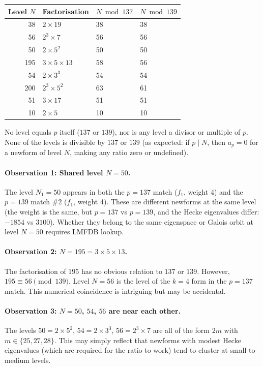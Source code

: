 \documentclass[12pt,a4paper]{article}
\begin{document}
\begin{center}
\begin{tabular}{rlll}
\toprule
Level $N$ & Factorisation & $N \bmod 137$ & $N \bmod 139$ \\
\midrule
38  & $2 \times 19$       & 38 & 38  \\
56  & $2^3 \times 7$      & 56 & 56  \\
50  & $2 \times 5^2$      & 50 & 50  \\
195 & $3 \times 5 \times 13$ & 58 & 56  \\
54  & $2 \times 3^3$      & 54 & 54  \\
200 & $2^3 \times 5^2$    & 63 & 61  \\
51  & $3 \times 17$       & 51 & 51  \\
10  & $2 \times 5$        & 10 & 10  \\
\bottomrule
\end{tabular}
\end{center}

\noindent No level equals $p$ itself ($137$ or $139$), nor is any level a
divisor or multiple of $p$.  None of the levels is divisible by $137$
or $139$ (as expected: if $p \mid N$, then $a_p = 0$ for a newform of
level $N$, making any ratio zero or undefined).

\paragraph{Observation 1: Shared level $N=50$.}
The level $N_1 = 50$ appears in both the $p=137$ match ($f_1$, weight 4)
and the $p=139$ match \#2 ($f_1$, weight 4).  These are different
newforms at the same level (the weight is the same, but $p=137$ vs
$p=139$, and the Hecke eigenvalues differ: $-1854$ vs $3100$).  Whether
they belong to the same eigenspace or Galois orbit at level $N=50$
requires LMFDB lookup.

\paragraph{Observation 2: $N=195 = 3 \times 5 \times 13$.}
The factorisation of $195$ has no obvious relation to $137$ or $139$.
However, $195 \equiv 56 \pmod{139}$.  Level $N=56$ is the level of the
$k=4$ form in the $p=137$ match.  This numerical coincidence is intriguing
but may be accidental.

\paragraph{Observation 3: $N = 50$, $54$, $56$ are near each other.}
The levels $50 = 2 \times 5^2$, $54 = 2 \times 3^3$, $56 = 2^3 \times 7$
are all of the form $2m$ with $m \in \{25, 27, 28\}$.  This may simply
reflect that newforms with modest Hecke eigenvalues (which are required
for the ratio to work) tend to cluster at small-to-medium levels.
\end{document}
